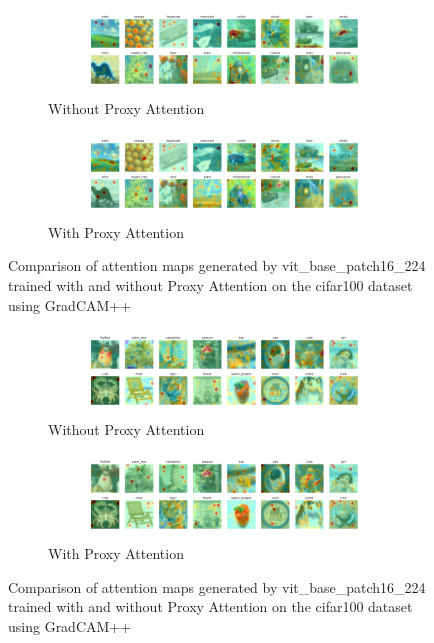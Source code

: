 \documentclass[a4paper,11pt,openright]{book}
\begin{document}
\begin{figure}[!htb]
    \centering
    \begin{subfigure}[b]{1\textwidth}
        \includegraphics[width=\textwidth]{images/cifar100_vit_base_patch16_224_noproxy_2.pdf}
        \caption{Without Proxy Attention}
    \end{subfigure}
    \hfill
    \begin{subfigure}[b]{1\textwidth}
        \includegraphics[width=\textwidth]{images/cifar100_vit_base_patch16_224_proxy_2.pdf}
        \caption{With Proxy Attention}
    \end{subfigure}
    \caption{Comparison of attention maps generated by vit\_base\_patch16\_224 trained with and without Proxy Attention on the cifar100 dataset using GradCAM++}
\end{figure}


\begin{figure}[!htb]
    \centering
    \begin{subfigure}[b]{1\textwidth}
        \includegraphics[width=\textwidth]{images/cifar100_vit_base_patch16_224_noproxy_3.pdf}
        \caption{Without Proxy Attention}
    \end{subfigure}
    \hfill
    \begin{subfigure}[b]{1\textwidth}
        \includegraphics[width=\textwidth]{images/cifar100_vit_base_patch16_224_proxy_3.pdf}
        \caption{With Proxy Attention}
    \end{subfigure}
    \caption{Comparison of attention maps generated by vit\_base\_patch16\_224 trained with and without Proxy Attention on the cifar100 dataset using GradCAM++}
\end{figure}
\end{document}

